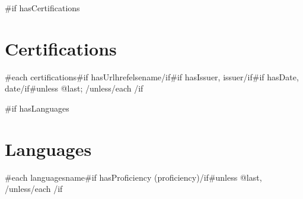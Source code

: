 \documentclass[10pt,a4paper]{article}
\begin{document}
{{#if hasCertifications}}
\section*{Certifications}
{{#each certifications}}{{#if hasUrl}}{{href}}{{else}}{{name}}{{/if}}{{#if hasIssuer}}, {{issuer}}{{/if}}{{#if hasDate}}, {{date}}{{/if}}{{#unless @last}}; {{/unless}}{{/each}}
{{/if}}

{{#if hasLanguages}}
\section*{Languages}
{{#each languages}}{{name}}{{#if hasProficiency}} ({{proficiency}}){{/if}}{{#unless @last}}, {{/unless}}{{/each}}
{{/if}}
\end{document}
